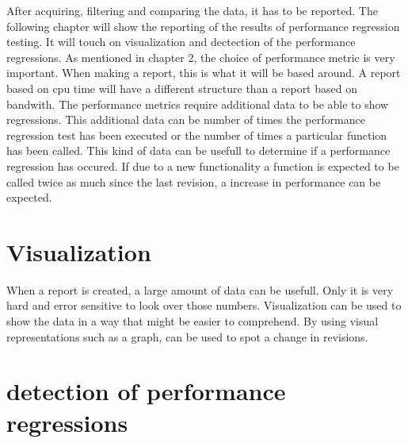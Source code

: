 After acquiring, filtering and comparing the data, it has to be reported. The following chapter will show the reporting of the results of performance regression testing. It will touch on visualization and dectection of the performance regressions. \newline
\newline
As mentioned in chapter 2, the choice of performance metric is very important. When making a report, this is what it will be based around. A report based on cpu time will have a different structure than a report based on bandwith. The performance metrics require additional data to be able to show regressions. This additional data can be number of times the performance regression test has been executed or the number of times a particular function has been called. This kind of data can be usefull to determine if a performance regression has occured. If due to a new functionality a function is expected to be called twice as much since the last revision, a increase in performance can be expected.\newline

\section{Visualization}
When a report is created, a large amount of data can be usefull. Only it is very hard and error sensitive to look over those numbers. Visualization can be used to show the data in a way that might be easier to comprehend. By using visual representations such as a graph, can be used to spot a change in revisions.

\section{detection of performance regressions}





